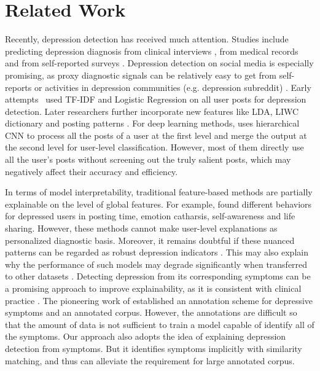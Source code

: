 \section{Related Work}
Recently, depression detection has received much attention. Studies include predicting depression diagnosis from clinical interviews \citep{gratch2014distress, dinkel2019text}, from medical records \citep{eichstaedt2018facebook} and from self-reported surveys \citep{guntuku2019twitter}. Depression detection on social media is especially promising, as proxy diagnostic signals can be relatively easy to get from self-reports or activities in depression communities (e.g. depression subreddit) \citep{losada2016test,yates2017depression,wolohan2018detecting,ernala2019methodological}. Early attempts~\citep{losada2016test} used TF-IDF and Logistic Regression on all user posts for depression detection. Later researchers further incorporate new features like LDA, LIWC dictionary and posting patterns \citep{trotzek2018utilizing, harrigian2020models}. For deep learning methods, \citet{yates2017depression} uses hierarchical CNN to process all the posts of a user at the first level and merge the output at the second level for user-level classification. However, most of them directly use all the user's posts without screening out the truly salient posts, which may negatively affect their accuracy and efficiency.

In terms of model interpretability, traditional feature-based methods are partially explainable on the level of global features. For example, \citet{shen2017depression} found different behaviors for depressed users in posting time, emotion catharsis, self-awareness and life sharing. However, these methods cannot make user-level explanations as personalized diagnostic basis. Moreover, it remains doubtful if these nuanced patterns can be regarded as robust depression indicators \citep{ernala2019methodological}. This may also explain why the performance of such models may degrade significantly when transferred to other datasets \citep{harrigian2020models}. Detecting depression from its corresponding symptoms can be a promising approach to improve explainability, as it is consistent with clinical practice \citep{edition2013diagnostic}. The pioneering work of \citet{mowery2017understanding} established an annotation scheme for depressive symptoms and an annotated corpus. However, the annotations are difficult so that the amount of data is not sufficient to train a model capable of identify all of the symptoms. Our approach also adopts the idea of explaining depression detection from symptoms. But it identifies symptoms implicitly with similarity matching, and thus can alleviate the requirement for large annotated corpus.

